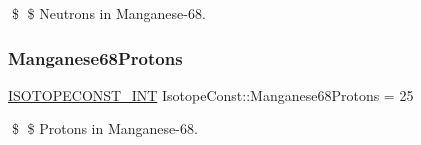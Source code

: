 \$ \$ Neutrons in Manganese-\/68. \mbox{\label{group___isotope_const-_manganese-_mn68_ga9adb55aa550e73d7561b670ebe9263f3}} 
\subsubsection{\texorpdfstring{Manganese68\+Protons}{Manganese68Protons}}
{\footnotesize\ttfamily \mbox{\hyperlink{group___isotope_const-_macros_ga5f18360b3e99483a35c32d789e62621c}{I\+S\+O\+T\+O\+P\+E\+C\+O\+N\+S\+T\+\_\+\+I\+NT}} Isotope\+Const\+::\+Manganese68\+Protons = 25}

\$ \$ Protons in Manganese-\/68. 